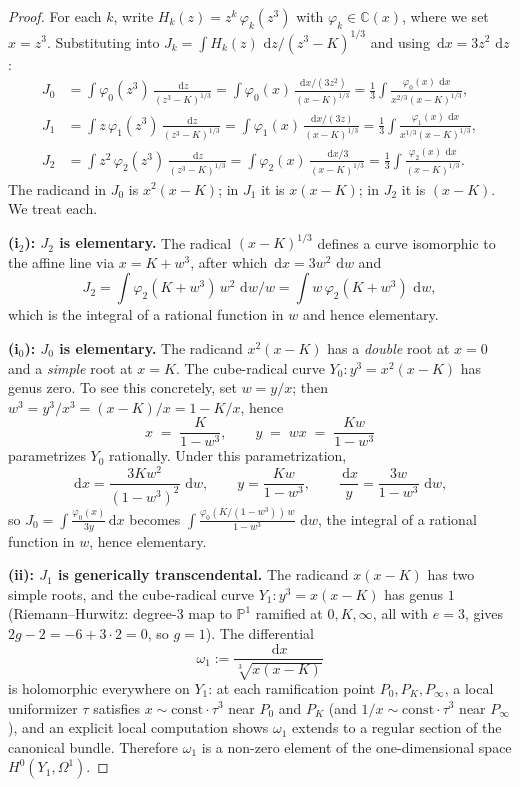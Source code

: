 \documentclass[11pt,a4paper]{article}
\theoremstyle{plain}
\theoremstyle{definition}
\theoremstyle{remark}
\newcommand{\C}{\mathbb{C}}
\renewcommand{\d}{\,\mathrm{d}}
\begin{document}
\begin{proof}
For each $k$, write $H_k(z)=z^k\,\varphi_k(z^3)$ with $\varphi_k\in\C(x)$, where we set $x=z^3$. Substituting into $J_k = \int H_k(z)\,\d z/(z^3-K)^{1/3}$ and using $\d x = 3z^2\,\d z$:
\begin{align*}
  J_0 &= \int \varphi_0(z^3)\,\frac{\d z}{(z^3-K)^{1/3}}
       = \int \varphi_0(x)\,\frac{\d x/(3z^2)}{(x-K)^{1/3}}
       = \frac{1}{3}\int \frac{\varphi_0(x)\,\d x}{x^{2/3}(x-K)^{1/3}}, \\[2pt]
  J_1 &= \int z\,\varphi_1(z^3)\,\frac{\d z}{(z^3-K)^{1/3}}
       = \int \varphi_1(x)\,\frac{\d x/(3z)}{(x-K)^{1/3}}
       = \frac{1}{3}\int \frac{\varphi_1(x)\,\d x}{x^{1/3}(x-K)^{1/3}}, \\[2pt]
  J_2 &= \int z^2\,\varphi_2(z^3)\,\frac{\d z}{(z^3-K)^{1/3}}
       = \int \varphi_2(x)\,\frac{\d x/3}{(x-K)^{1/3}}
       = \frac{1}{3}\int \frac{\varphi_2(x)\,\d x}{(x-K)^{1/3}}.
\end{align*}
The radicand in $J_0$ is $x^2(x-K)$; in $J_1$ it is $x(x-K)$; in $J_2$ it is $(x-K)$. We treat each.

\smallskip\noindent
\textbf{(i$_2$): $J_2$ is elementary.}
The radical $(x-K)^{1/3}$ defines a curve isomorphic to the affine line via $x=K+w^3$, after which $\d x = 3w^2\,\d w$ and
\[
  J_2 = \int \varphi_2(K+w^3)\,w^2\,\d w/w = \int w\,\varphi_2(K+w^3)\,\d w,
\]
which is the integral of a rational function in $w$ and hence elementary.

\smallskip\noindent
\textbf{(i$_0$): $J_0$ is elementary.}
The radicand $x^2(x-K)$ has a \emph{double} root at $x=0$ and a \emph{simple} root at $x=K$. The cube-radical curve $Y_0\colon y^3 = x^2(x-K)$ has genus zero. To see this concretely, set $w = y/x$; then $w^3 = y^3/x^3 = (x-K)/x = 1 - K/x$, hence
\begin{equation}\label{eq:Y0-param}
  x \;=\; \frac{K}{1-w^3},\qquad y \;=\; w x \;=\; \frac{Kw}{1-w^3}
\end{equation}
parametrizes $Y_0$ rationally. Under this parametrization,
\[
  \d x = \frac{3Kw^2}{(1-w^3)^2}\,\d w, \qquad y = \frac{Kw}{1-w^3}, \qquad \frac{\d x}{y} = \frac{3w}{1-w^3}\,\d w,
\]
so $J_0 = \int \frac{\varphi_0(x)}{3y}\d x$ becomes $\int \frac{\varphi_0(K/(1-w^3))\,w}{1-w^3}\,\d w$, the integral of a rational function in $w$, hence elementary.

\smallskip\noindent
\textbf{(ii): $J_1$ is generically transcendental.}
The radicand $x(x-K)$ has two simple roots, and the cube-radical curve $Y_1\colon y^3 = x(x-K)$ has genus $1$ (Riemann--Hurwitz: degree-$3$ map to $\mathbb{P}^1$ ramified at $0,K,\infty$, all with $e=3$, gives $2g-2 = -6 + 3\cdot 2 = 0$, so $g=1$). The differential
\[
  \omega_1 := \frac{\d x}{\sqrt[3]{x(x-K)}}
\]
is holomorphic everywhere on $Y_1$: at each ramification point $P_0,P_K,P_\infty$, a local uniformizer $\tau$ satisfies $x\sim\text{const}\cdot\tau^3$ near $P_0$ and $P_K$ (and $1/x\sim \text{const}\cdot\tau^3$ near $P_\infty$), and an explicit local computation shows $\omega_1$ extends to a regular section of the canonical bundle. Therefore $\omega_1$ is a non-zero element of the one-dimensional space $H^0(Y_1,\Omega^1)$.


\end{proof}
\end{document}
